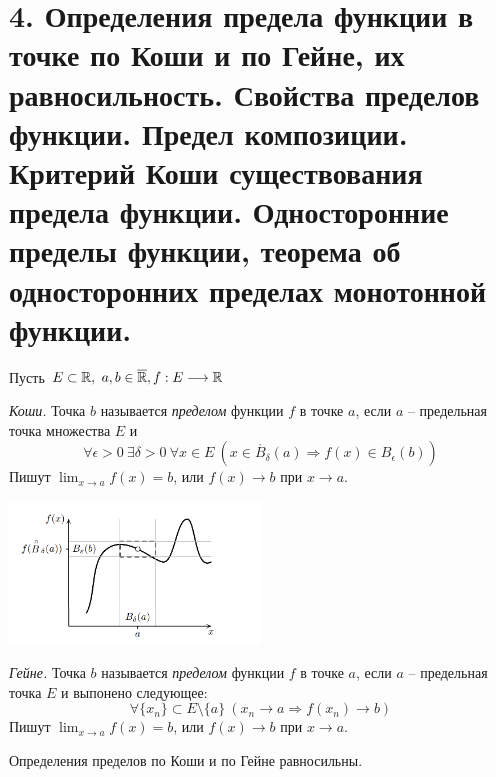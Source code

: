 \section{4. Определения предела функции в точке по Коши и по Гейне, их равносильность. Свойства пределов функции. Предел композиции. Критерий Коши существования предела функции. Односторонние пределы функции, теорема об односторонних пределах монотонной функции.}

    Пусть $E \subset \mathbb{R}, \ a,b \in \overline{\mathbb{R}}, f: E \longrightarrow \mathbb{R}$
    
    \begin{definition}{\textit{Коши.}}
        Точка $b$ называется \textit{пределом} функции $f$ в точке $a$, если $a$ -- предельная точка множества $E$ и
        \[\forall \epsilon > 0 \ \exists \delta > 0 \ \forall x \in E \ (x \in \mathring{B_{\delta}}(a) \Rightarrow f(x) \in B_{\epsilon}(b))\]
        Пишут $\lim_{x \rightarrow a} f(x) =  b$, или $f(x) \rightarrow b$ при $x \rightarrow a$.
    \end{definition}
    
    \begin{center}
        \includegraphics[width=0.5\textwidth]{colloq3.png}
    \end{center}
    
    \begin{definition}{\textit{Гейне.}}
        Точка $b$ называется \textit{пределом} функции $f$ в точке $a$, если $a$ -- предельная точка $E$ и выпонено следующее:
        \[\forall\{x_{n}\} \subset E \setminus \{a\} \ (x_{n} \rightarrow a \Rightarrow f(x_{n}) \rightarrow b )\]
        Пишут $\lim_{x \rightarrow a} f(x) =  b$, или $f(x) \rightarrow b$ при $x \rightarrow a$.
    \end{definition}
    
    \begin{theorem}
        Определения пределов по Коши и по Гейне равносильны.
    \end{theorem}

